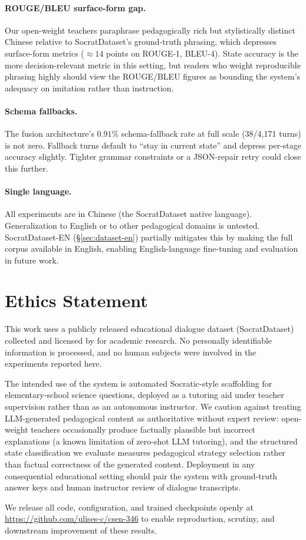 \documentclass[11pt]{article}
\begin{document}
\paragraph{ROUGE/BLEU surface-form gap.} Our open-weight teachers paraphrase pedagogically rich but stylistically distinct Chinese relative to SocratDataset's ground-truth phrasing, which depresses surface-form metrics ($\approx 14$ points on ROUGE-1, BLEU-4). State accuracy is the more decision-relevant metric in this setting, but readers who weight reproducible phrasing highly should view the ROUGE/BLEU figures as bounding the system's adequacy on imitation rather than instruction.

\paragraph{Schema fallbacks.} The fusion architecture's $0.91\%$ schema-fallback rate at full scale (38/4{,}171 turns) is not zero. Fallback turns default to ``stay in current state'' and depress per-stage accuracy slightly. Tighter grammar constraints or a JSON-repair retry could close this further.

\paragraph{Single language.} All experiments are in Chinese (the SocratDataset native language). Generalization to English or to other pedagogical domains is untested. SocratDataset-EN (\S\ref{sec:dataset-en}) partially mitigates this by making the full corpus available in English, enabling English-language fine-tuning and evaluation in future work.

\section*{Ethics Statement}

This work uses a publicly released educational dialogue dataset (SocratDataset) collected and licensed by \citet{peng2025kele} for academic research. No personally identifiable information is processed, and no human subjects were involved in the experiments reported here.

The intended use of the system is automated Socratic-style scaffolding for elementary-school science questions, deployed as a tutoring aid under teacher supervision rather than as an autonomous instructor. We caution against treating LLM-generated pedagogical content as authoritative without expert review: open-weight teachers occasionally produce factually plausible but incorrect explanations (a known limitation of zero-shot LLM tutoring), and the structured state classification we evaluate measures pedagogical strategy selection rather than factual correctness of the generated content. Deployment in any consequential educational setting should pair the system with ground-truth answer keys and human instructor review of dialogue transcripts.

We release all code, configuration, and trained checkpoints openly at \url{https://github.com/ulises-c/csen-346} to enable reproduction, scrutiny, and downstream improvement of these results.


\end{document}
